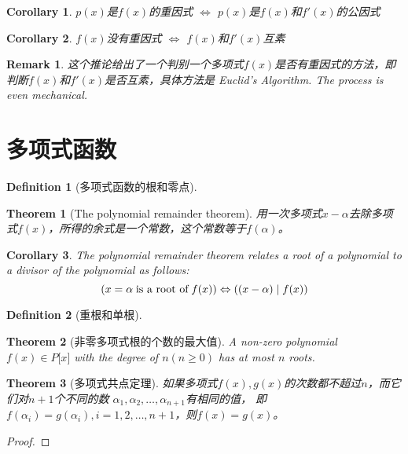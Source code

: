 \documentclass[onecolumn]{ctexart}
\newtheorem{definition}{Definition}
\newtheorem{theorem}{Theorem}
\newtheorem{corollary}{Corollary}
\newtheorem{remark}{Remark}
\begin{document}
\begin{corollary}
  $p(x)$是$f(x)$的重因式 $\Leftrightarrow$ $p(x)$是$f(x)$和$f'(x)$的公因式
\end{corollary}

\begin{corollary}
  $f(x)$没有重因式 $\Leftrightarrow$ $f(x)$和$f'(x)$互素
\end{corollary}
\begin{remark}
  这个推论给出了一个判别一个多项式$f(x)$是否有重因式的方法，即判断$f(x)$和$f'(x)$是否互素，具体方法是
  Euclid's Algorithm. The process is even mechanical.
\end{remark}

\section{多项式函数}

\begin{definition}[多项式函数的根和零点]
  
\end{definition}

\begin{theorem}[The polynomial remainder theorem]
  用一次多项式$x - \alpha$去除多项式$f(x)$，所得的余式是一个常数，这个常数等于$f(\alpha)$。
\end{theorem}
\begin{corollary}
  The polynomial remainder theorem relates a root of a polynomial to a divisor 
  of the polynomial as follows:
  \[
    (x = \alpha \thickspace \textnormal{is a root of} \thickspace f(x)) \Leftrightarrow ((x - \alpha) \mid f(x))
  \]
\end{corollary}

\begin{definition}[重根和单根]
  
\end{definition}

\begin{theorem}[非零多项式根的个数的最大值]
  A non-zero polynomial $f(x) \in P\lbrack x \rbrack$ with the degree of $n (n 
  \geq 0)$ has at most $n$ roots.
\end{theorem}

\begin{theorem}[多项式共点定理]
  如果多项式$f(x), g(x)$的次数都不超过$n$，而它们对$n+1$个不同的数
  $\alpha_1, \alpha_2, \ldots, \alpha_{n+1}$有相同的值，
  即$f(\alpha_i) = g(\alpha_i), i=1,2,\ldots,n+1$，则$f(x) = g(x)$。
\end{theorem}
\begin{proof}
  
\end{proof}
\end{document}
